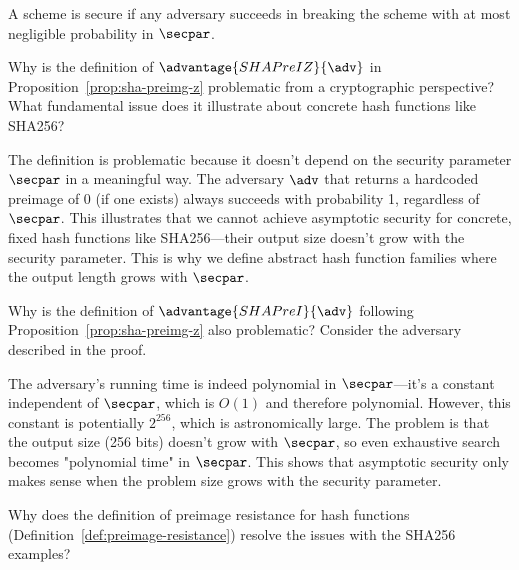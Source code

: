\ifsolutions
\begin{mysolution}
  A scheme is secure if any \ppt adversary succeeds in breaking the scheme with at most negligible probability in $\secpar$.
\end{mysolution}
\fi

\begin{exercise}\label{ex:sha-preimage-problem}
  Why is the definition of $\advantage{SHAPreIZ}{\adv}$ in Proposition~\ref{prop:sha-preimg-z} problematic from a cryptographic perspective?
  What fundamental issue does it illustrate about concrete hash functions like SHA256?
\end{exercise}

\ifsolutions
\begin{mysolution}
  The definition is problematic because it doesn't depend on the security parameter $\secpar$ in a meaningful way.
  The adversary $\adv$ that returns a hardcoded preimage of 0 (if one exists) always succeeds with probability 1, regardless of $\secpar$.
  This illustrates that we cannot achieve asymptotic security for concrete, fixed hash functions like SHA256—their output size doesn't grow with the security parameter.
  This is why we define abstract hash function families where the output length grows with $\secpar$.
\end{mysolution}
\fi

\begin{exercise}\label{ex:sha-random-preimage-problem}
  Why is the definition of $\advantage{SHAPreI}{\adv}$ following Proposition~\ref{prop:sha-preimg-z} also problematic?
  Consider the adversary described in the proof.
\end{exercise}

\ifsolutions
\begin{mysolution}
  The adversary's running time is indeed polynomial in $\secpar$—it's a constant independent of $\secpar$, which is $O(1)$ and therefore polynomial.
  However, this constant is potentially $2^{256}$, which is astronomically large.
  The problem is that the output size (256 bits) doesn't grow with $\secpar$, so even exhaustive search becomes "polynomial time" in $\secpar$.
  This shows that asymptotic security only makes sense when the problem size grows with the security parameter.
\end{mysolution}
\fi

\begin{exercise}\label{ex:hash-function-definition}
  Why does the definition of preimage resistance for hash functions (Definition~\ref{def:preimage-resistance}) resolve the issues with the SHA256 examples?
\end{exercise}


